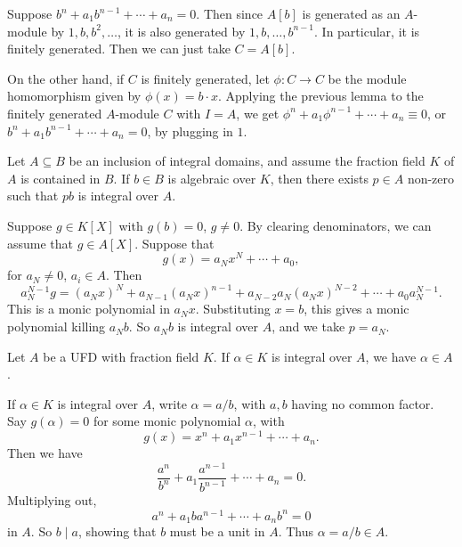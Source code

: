 \documentclass[12pt]{article}
\begin{document}
\begin{proofbox}
	Suppose $b^n + a_1 b^{n-1} + \cdots + a_n = 0$. Then since $A[b]$ is generated as an $A$-module by $1, b, b^2, \ldots$, it is also generated by $1, b, \ldots, b^{n-1}$. In particular, it is finitely generated. Then we can just take $C = A[b]$.

	On the other hand, if $C$ is finitely generated, let $\phi : C \to C$ be the module homomorphism given by $\phi(x) = b \cdot x$. Applying the previous lemma to the finitely generated $A$-module $C$ with $I = A$, we get $\phi^n + a_1 \phi^{n-1} + \cdots + a_n \equiv 0$, or $b^n + a_1 b^{n-1} + \cdots + a_n = 0$, by plugging in $1$.
\end{proofbox}


\begin{lemma}
	Let $A \subseteq B$ be an inclusion of integral domains, and assume the fraction field $K$ of $A$ is contained in $B$. If $b \in B$ is algebraic over $K$, then there exists $p \in A$ non-zero such that $pb$ is integral over $A$.
\end{lemma}

\begin{proofbox}
	Suppose $g \in K[X]$ with $g(b) = 0$, $g \neq 0$. By clearing denominators, we can assume that $g \in A[X]$. Suppose that
	 \[
	g(x) = a_N x^N + \cdots + a_0,
	\]
	for $a_N \neq 0$, $a_i \in A$. Then
	\[
		a_N^{N-1} g = (a_Nx)^N + a_{N-1}(a_N x)^{n-1} + a_{N-2} a_N (a_N x)^{N-2} + \cdots + a_0 a_N^{N-1}.
	\]
	This is a monic polynomial in $a_N x$. Substituting $x = b$, this gives a monic polynomial killing $a_N b$. So $a_N b$ is integral over $A$, and we take $p = a_N$.
\end{proofbox}

\begin{lemma}
	Let $A$ be a UFD with fraction field $K$. If $\alpha \in K$ is integral over $A$, we have $\alpha \in A$.
\end{lemma}

\begin{proofbox}
	If $\alpha \in K$ is integral over $A$, write $\alpha = a/b$, with $a, b$ having no common factor. Say $g(\alpha) = 0$ for some monic polynomial $\alpha$, with
	\[
	g(x) = x^n + a_1 x^{n-1} + \cdots + a_n.
	\]
	Then we have
	\[
	\frac{a^n}{b^n} + a_1 \frac{a^{n-1}}{b^{n-1}} + \cdots + a_n = 0.
	\]
	Multiplying out,
	\[
	a^n + a_1 b a^{n-1} + \cdots + a_n b^n = 0
	\]
	in $A$. So $b \mid a$, showing that $b$ must be a unit in $A$. Thus $\alpha = a/b \in A$.
\end{proofbox}
\end{document}
